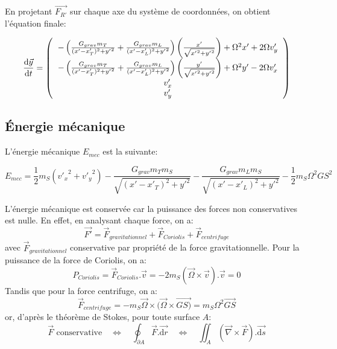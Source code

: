 \documentclass[a4paper,12pt,twoside]{article}
\begin{document}
En projetant $\vec{F_{R'}}$ sur chaque axe du système de coordonnées, on obtient l'équation finale:

\begin{equation}
\displaystyle\frac{\text{d}\vec{y}}{\text{d}t}= \left(
\begin{tabular}{c}
     $-\left(\frac{G_{grav}m_T}{(x'-x'_T)^2+{y'}^2}+\frac{G_{grav}m_L}{(x'-x'_L)^2+{y'}^2}\right)\left(\frac{x'}{\sqrt{{x'}^2+{y'}^2}}\right)+ \Omega^2x' + 2\Omega v'_y$ \\
     $-\left(\frac{G_{grav}m_T}{(x'-x'_T)^2+{y'}^2}+\frac{G_{grav}m_L}{(x'-x'_L)^2+{y'}^2}\right)\left(\frac{y'}{\sqrt{{x'}^2+{y'}^2}}\right)+ \Omega^2y' - 2\Omega v'_x$\\
     $v'_x$\\
     $v'_y$
\end{tabular}
\right)
\end{equation}

\subsection{Énergie mécanique}

L'énergie mécanique $E_{mec}$ est la suivante:

\begin{equation}
E_{mec} = \displaystyle\frac{1}{2}m_S\left({v'_x}^2+{v'_y}^2\right)-\displaystyle\frac{G_{grav}m_Tm_S}{\sqrt{(x'-x'_T)^2+{y'}^2}}-\displaystyle\frac{G_{grav}m_Lm_S}{\sqrt{(x'-x'_L)^2+{y'}^2}}
 - \displaystyle\frac{1}{2}m_S\Omega^2{GS}^2
 \end{equation}

L'énergie mécanique est conservée car la puissance des forces non conservatives est nulle. En effet, en analysant chaque force, on a:
\begin{equation}
\vec{F'} = \vec{F}_{gravitationnel}+\vec{F}_{Coriolis}+\vec{F}_{centrifuge}
\end{equation}
avec $\vec{F}_{gravitationnel}$ conservative par propriété de la force gravitationnelle. Pour la puissance de la force de Coriolis, on a:
\begin{equation}
P_{Coriolis} = \vec{F}_{Coriolis}. \vec{v} = -2m_S(\vec{\Omega}\times\vec{v}).\vec{v} = 0
\end{equation}
Tandis que pour la force centrifuge, on a:
\begin{equation}
\vec{F}_{centrifuge} = -m_S\vec{\Omega}\times(\vec{\Omega}\times\vec{GS)}= m_S\Omega^2\vec{GS}
\end{equation}
or, d'après le théorème de Stokes, pour toute surface $A$:
\begin{equation}
\vec{F} \text{ conservative} \quad\Leftrightarrow\quad \oint_{\partial A}\vec{F}.\vec{\text{d}r} \quad\Leftrightarrow\quad \iint_{A}\left(\vec{\nabla}\times \vec{F}\right).\vec{\text{d}s}
\end{equation}
\end{document}
